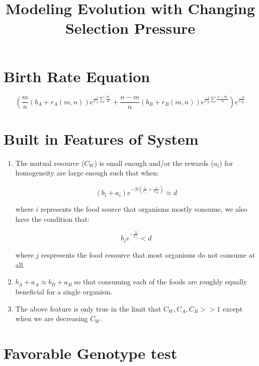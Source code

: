 \documentclass[11pt]{article}
\title{Modeling Evolution with Changing Selection Pressure}
\author{\Name}
\date{}
\begin{document}
\maketitle

\section*{Birth Rate Equation}

	\begin{equation*}
			(\frac{m}{n}(b_A + r_A(m,n))e^{\frac{-1}{C_A}\sum{\frac{m_i}{n}}} + \frac{n - m}{n}(b_B + r_B(m,n))e^{\frac{-1}{C_B}\sum{\frac{n - m_i}{n}}})e^{\frac{-N}{C_W}}
		\end{equation*}
		
\section*{Built in Features of System}

\begin{enumerate}

	\item
	The mutual resource ($C_W$) is small enough and/or the rewards ($a_i$) for homogeneity are large enough such that when:
	
	\begin{equation} \label{eq:1}
		(b_i + a_i)e^{-N(\frac{1}{C_i} + \frac{1}{C_W})} \approx d
	\end{equation}
	
	where $i$ represents the food source that organisms mostly consume, we also have the condition that:
	
	\begin{equation*}
		b_je^{-\frac{N}{C_j}} < d
	\end{equation*}
	
	where $j$ respresents the food resource that most organisms do not consume at all.
	
	\item
	$b_A + a_A \approx b_B + a_B$ so that consuming each of the foods are roughly equally beneficial for a single organism.
	
	\item
	The above feature is only true in the limit that $C_W,C_A,C_B >> 1$ except when we are decreasing $C_W$.
	
\end{enumerate}
	
\section*{Favorable Genotype test}
	
\end{document}
